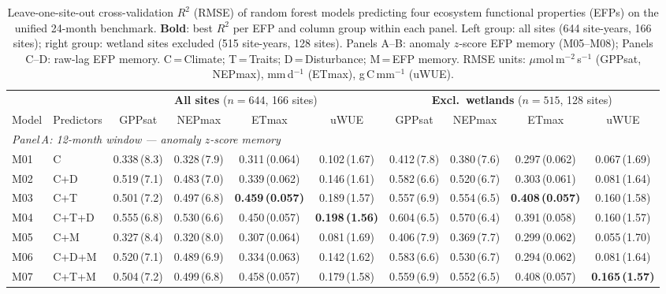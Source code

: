 \begin{table}
\centering
\caption{Leave-one-site-out cross-validation $R^2$ (RMSE) of random forest
models predicting four ecosystem functional properties (EFPs) on the unified
24-month benchmark. \textbf{Bold}: best $R^2$ per EFP and column group within
each panel. Left group: all sites (644 site-years, 166 sites); right group:
wetland sites excluded (515 site-years, 128 sites). Panels A--B: anomaly
$z$-score EFP memory (M05--M08); Panels C--D: raw-lag EFP memory.
C\,=\,Climate; T\,=\,Traits; D\,=\,Disturbance; M\,=\,EFP memory.
RMSE units: $\mu$mol\,m$^{-2}$\,s$^{-1}$ (GPPsat, NEPmax),
mm\,d$^{-1}$ (ETmax), g\,C\,mm$^{-1}$ (uWUE).}
\label{tab:RF_LOSO_24mbench_noWET}
\scriptsize
\setlength{\tabcolsep}{3pt}
\renewcommand{\arraystretch}{1.0}
\begin{tabular}{@{}llcccccccc@{}}
\toprule
& & \multicolumn{4}{c}{\textbf{All sites} ($n=644$, 166 sites)} &
      \multicolumn{4}{c}{\textbf{Excl.\ wetlands} ($n=515$, 128 sites)} \\
\cmidrule(lr){3-6}\cmidrule(lr){7-10}
Model & Predictors & GPPsat & NEPmax & ETmax & uWUE &
                     GPPsat & NEPmax & ETmax & uWUE \\
\midrule
\multicolumn{10}{l}{\textit{Panel\,A: 12-month window --- anomaly $z$-score memory}} \\
\midrule
M01 & C & 0.338\,(8.3) & 0.328\,(7.9) & 0.311\,(0.064) & 0.102\,(1.67) & 0.412\,(7.8) & 0.380\,(7.6) & 0.297\,(0.062) & 0.067\,(1.69) \\
M02 & C+D & 0.519\,(7.1) & 0.483\,(7.0) & 0.339\,(0.062) & 0.146\,(1.61) & 0.582\,(6.6) & 0.520\,(6.7) & 0.303\,(0.061) & 0.081\,(1.64) \\
M03 & C+T & 0.501\,(7.2) & 0.497\,(6.8) & \textbf{0.459\,(0.057)} & 0.189\,(1.57) & 0.557\,(6.9) & 0.554\,(6.5) & \textbf{0.408\,(0.057)} & 0.160\,(1.58) \\
M04 & C+T+D & 0.555\,(6.8) & 0.530\,(6.6) & 0.450\,(0.057) & \textbf{0.198\,(1.56)} & 0.604\,(6.5) & 0.570\,(6.4) & 0.391\,(0.058) & 0.160\,(1.57) \\
M05 & C+M & 0.327\,(8.4) & 0.320\,(8.0) & 0.307\,(0.064) & 0.081\,(1.69) & 0.406\,(7.9) & 0.369\,(7.7) & 0.299\,(0.062) & 0.055\,(1.70) \\
M06 & C+D+M & 0.520\,(7.1) & 0.489\,(6.9) & 0.334\,(0.063) & 0.142\,(1.62) & 0.583\,(6.6) & 0.530\,(6.7) & 0.294\,(0.062) & 0.081\,(1.64) \\
M07 & C+T+M & 0.504\,(7.2) & 0.499\,(6.8) & 0.458\,(0.057) & 0.179\,(1.58) & 0.559\,(6.9) & 0.552\,(6.5) & 0.408\,(0.057) & \textbf{0.165\,(1.57)} \\

\end{tabular}
\end{table}
